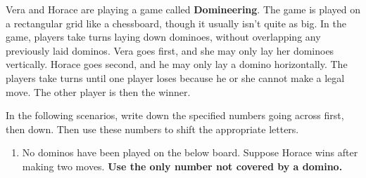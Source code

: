 
\begin{puzzle}
Vera and Horace are playing a game called \textbf{Domineering}. The game is
played on a rectangular grid like a chessboard, though it usually isn't quite as
big. In the game, players take turns laying down dominoes, without overlapping
any previously laid dominos. Vera goes first,
and she may only lay her dominoes vertically. Horace goes second, and he may
only lay a domino horizontally. The players take turns until one player loses
because he or she cannot make a legal move. The other player is then the winner.

In the following scenarios, write down the specified numbers going across
first, then down. Then use these numbers to shift the appropriate letters.
\begin{center}
\end{center}

\vfill

\begin{enumerate}
  \item
    No dominos have been played on the below board.
    Suppose Horace wins after making two moves.
    \textbf{Use the only number not covered by a domino.}
    \begin{center}
    \end{center}
    \begin{center}
    \end{center}


\end{enumerate}
\end{puzzle}
